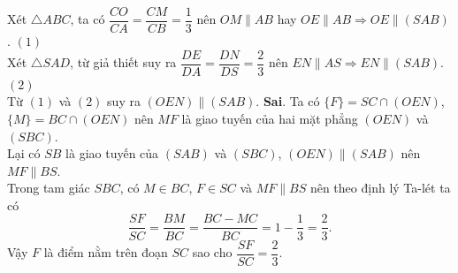 \begin{ex}
{\begin{itemchoice}
   Xét $\triangle ABC$,  ta có $\dfrac{CO}{CA} =\dfrac{CM}{CB} = \dfrac{1}{3}$ nên $OM\parallel AB$ hay $OE\parallel AB \Rightarrow OE\parallel (SAB)$. \hfill $(1)$\\
   Xét $\triangle SAD$, từ  giả thiết suy ra $\dfrac{DE}{DA} =\dfrac{DN}{DS} = \dfrac{2}{3}$ nên $EN\parallel AS \Rightarrow EN\parallel (SAB)$. \hfill $(2)$\\
   Từ $(1)$ và $(2)$ suy ra $(OEN)\parallel (SAB)$. 
    \itemch \textbf{Sai}.
   Ta có $\{F\}=SC\cap (OEN)$, $\{M\}=BC\cap (OEN)$ nên $MF$ là giao tuyến của hai mặt phẳng $(OEN)$ và $(SBC)$.\\ 
   Lại có $SB$ là giao tuyến của $(SAB)$ và $(SBC)$, $(OEN)\parallel  (SAB)$ nên $MF\parallel BS$.\\
   Trong tam giác $SBC$, có $M\in BC$, $F\in SC$ và $MF\parallel BS$ nên theo định lý Ta-lét  ta có
   \[\dfrac{SF}{SC}=\dfrac{BM}{BC}  = \dfrac{BC-MC}{BC}=1-\dfrac{1}{3}=\dfrac{2}{3}.\]
   Vậy $F$  là điểm nằm trên đoạn $SC$ sao cho $\dfrac{SF}{SC}=\dfrac{2}{3}$.
  \end{itemchoice}
 } 
\end{ex}

